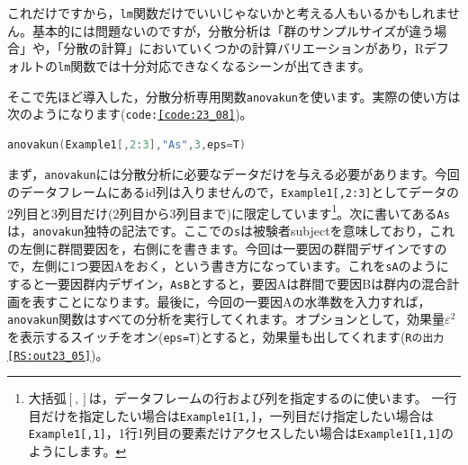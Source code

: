 \documentclass{ltjbook}
\begin{document}
これだけですから，\texttt{lm}関数だけでいいじゃないかと考える人もいるかもしれません。基本的には問題ないのですが，分散分析は「群のサンプルサイズが違う場合」や，「分散の計算」においていくつかの計算バリエーションがあり，Rデフォルトの\texttt{lm}関数では十分対応できなくなるシーンが出てきます。

そこで先ほど導入した，分散分析専用関数\texttt{anovakun}を使います。実際の使い方は次のようになります(\texttt{code:\ref{code:23_08}})。
\begin{lstlisting}[language=c++,label={code:23_08},caption={anovakunで実行}]
anovakun(Example1[,2:3],"As",3,eps=T)
\end{lstlisting}

まず，\texttt{anovakun}には分散分析に必要なデータだけを与える必要があります。今回のデータフレームにあるid列は入りませんので，\texttt{Example1[,2:3]}としてデータの2列目と3列目だけ(2列目から3列目まで)に限定しています\footnote{大括弧$\left[, \right]$は，データフレームの行および列を指定するのに使います。 一行目だけを指定したい場合は\texttt{Example1[1,]}，一列目だけ指定したい場合は\texttt{Example1[,1]}，1行1列目の要素だけアクセスしたい場合は\texttt{Example1[1,1]}のようにします。}。次に書いてある\texttt{As}は，\texttt{anovakun}独特の記法です。ここでの\texttt{s}は被験者subjectを意味しており，これの左側に群間要因を，右側にを書きます。今回は一要因の群間デザインですので，左側に1つ要因Aをおく，という書き方になっています。これを\texttt{sA}のようにすると一要因群内デザイン，\texttt{AsB}とすると，要因Aは群間で要因Bは群内の混合計画を表すことになります。最後に，今回の一要因Aの水準数を入力すれば，\texttt{anovakun}関数はすべての分析を実行してくれます。オプションとして，効果量$\varepsilon^2$を表示するスイッチをオン(\texttt{eps=T})とすると，効果量も出してくれます(\texttt{Rの出力\ref{RS:out23_05}})。
\end{document}
